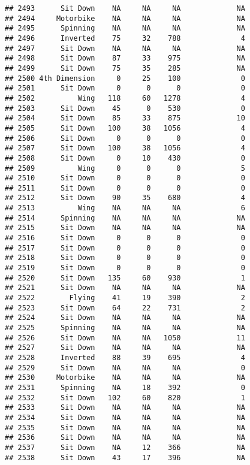 \documentclass[
]{article}
\begin{document}
\begin{verbatim}
## 2493      Sit Down    NA     NA     NA             NA
## 2494     Motorbike    NA     NA     NA             NA
## 2495      Spinning    NA     NA     NA             NA
## 2496      Inverted    75     32    788              4
## 2497      Sit Down    NA     NA     NA             NA
## 2498      Sit Down    87     33    975             NA
## 2499      Sit Down    75     35    285             NA
## 2500 4th Dimension     0     25    100              0
## 2501      Sit Down     0      0      0              0
## 2502          Wing   118     60   1278              4
## 2503      Sit Down    45      0    530              0
## 2504      Sit Down    85     33    875             10
## 2505      Sit Down   100     38   1056              4
## 2506      Sit Down     0      0      0              0
## 2507      Sit Down   100     38   1056              4
## 2508      Sit Down     0     10    430              0
## 2509          Wing     0      0      0              5
## 2510      Sit Down     0      0      0              0
## 2511      Sit Down     0      0      0              0
## 2512      Sit Down    90     35    680              4
## 2513          Wing    NA     NA     NA              6
## 2514      Spinning    NA     NA     NA             NA
## 2515      Sit Down    NA     NA     NA             NA
## 2516      Sit Down     0      0      0              0
## 2517      Sit Down     0      0      0              0
## 2518      Sit Down     0      0      0              0
## 2519      Sit Down     0      0      0              0
## 2520      Sit Down   135     60    930              1
## 2521      Sit Down    NA     NA     NA             NA
## 2522        Flying    41     19    390              2
## 2523      Sit Down    64     22    731              2
## 2524      Sit Down    NA     NA     NA             NA
## 2525      Spinning    NA     NA     NA             NA
## 2526      Sit Down    NA     NA   1050             11
## 2527      Sit Down    NA     NA     NA             NA
## 2528      Inverted    88     39    695              4
## 2529      Sit Down    NA     NA     NA              0
## 2530     Motorbike    NA     NA     NA             NA
## 2531      Spinning    NA     18    392              0
## 2532      Sit Down   102     60    820              1
## 2533      Sit Down    NA     NA     NA             NA
## 2534      Sit Down    NA     NA     NA             NA
## 2535      Sit Down    NA     NA     NA             NA
## 2536      Sit Down    NA     NA     NA             NA
## 2537      Sit Down    NA     12    366             NA
## 2538      Sit Down    43     17    396             NA

\end{verbatim}
\end{document}
